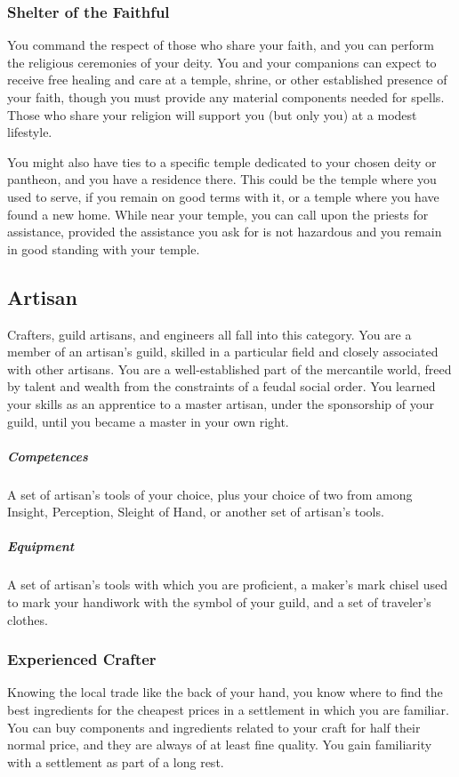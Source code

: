     \subsubsection{Shelter of the Faithful} \label{feat::shelterofthefaithful}
        You command the respect of those who share your faith, and you can perform the religious ceremonies of your deity.
        You and your companions can expect to receive free healing and care at a temple, shrine, or other established presence of your faith, though you must provide any material components needed for spells.
        Those who share your religion will support you (but only you) at a modest lifestyle.

        You might also have ties to a specific temple dedicated to your chosen deity or pantheon, and you have a residence there.
        This could be the temple where you used to serve, if you remain on good terms with it, or a temple where you have found a new home.
        While near your temple, you can call upon the priests for assistance, provided the assistance you ask for is not hazardous and you remain in good standing with your temple.

\subsection*{Artisan} \label{ssec::artisan}
    Crafters, guild artisans, and engineers all fall into this category.
    You are a member of an artisan's guild, skilled in a particular field and closely associated with other artisans.
    You are a well-established part of the mercantile world, freed by talent and wealth from the constraints of a feudal social order.
    You learned your skills as an apprentice to a master artisan, under the sponsorship of your guild, until you became a master in your own right.
    \subparagraph{Competences} A set of artisan's tools of your choice, plus your choice of two from among Insight, Perception, Sleight of Hand, or another set of artisan's tools.
    \subparagraph{Equipment} A set of artisan's tools with which you are proficient, a maker's mark chisel used to mark your handiwork with the symbol of your guild, and a set of traveler's clothes.
    \subsubsection{Experienced Crafter} \label{feat::experiencedcrafter}
        Knowing the local trade like the back of your hand, you know where to find the best ingredients for the cheapest prices in a settlement in which you are familiar.
        You can buy components and ingredients related to your craft for half their normal price, and they are always of at least fine quality.
        You gain familiarity with a settlement as part of a long rest.

